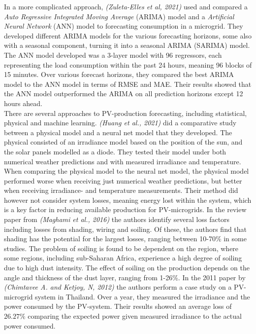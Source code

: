 In a more complicated approach, \textit{(Zuleta-Elles et al, 2021)} used and compared a \textit{Auto Regressive Integrated Moving Average} (ARIMA) model and a \textit{Artificial Neural Network} (ANN) model to forecasting consumption in a microgrid. They developed different ARIMA models for the various forecasting horizons, some also with a seasonal component, turning it into a seasonal ARIMA (SARIMA) model. The ANN model developed was a 3-layer model with 96 regressors, each representing the load consumption within the past 24 hours, meaning 96 blocks of 15 minutes. Over various forecast horizons, they compared the best ARIMA model to the ANN model in terms of RMSE and MAE. Their results showed that the ANN model outperformed the ARIMA on all prediction horizons except 12 hours ahead. \cite{Zuleta-Elles2021-qh}\\

There are several approaches to PV-production forecasting, including statistical, physical and machine learning. \textit{(Huang et al., 2021)} did a comparative study between a physical model and a neural net model that they developed. The physical consisted of an irradiance model based on the position of the sun, and the solar panels modelled as a diode. They tested their model under both numerical weather predictions and with measured irradiance and temperature. When comparing the physical model to the neural net model, the physical model performed worse when receiving just numerical weather predictions, but better when receiving irradiance- and temperature measurements.\cite{Huang2010-lv} Their method did however not consider system losses, meaning energy lost within the system, which is a key factor in reducing available production for PV-microgrids. 
In the review paper from \textit{(Maghami et al., 2016)} the authors identify several loss factors including losses from shading, wiring and soiling. Of these, the authors find that shading has the potential for the largest losses, ranging between 10-70\% in some studies. The problem of soiling is found to be dependent on the region, where some regions, including sub-Saharan Africa, experience a high degree of soiling due to high dust intensity. The effect of soiling on the production depends on the angle and thickness of the dust layer, ranging from 1-26\%.\cite{Maghami2016-pq} In the 2011 paper by \textit{(Chimtavee A. and Ketjoy, N, 2012)} the authors perform a case study on a PV-microgrid system in Thailand. Over a year, they measured the irradiance and the power consumed by the PV-system. Their results showed an average loss of $26.27\%$ comparing the expected power given measured irradiance to the actual power consumed.\cite{Chimtavee2012-gg}\\ 




